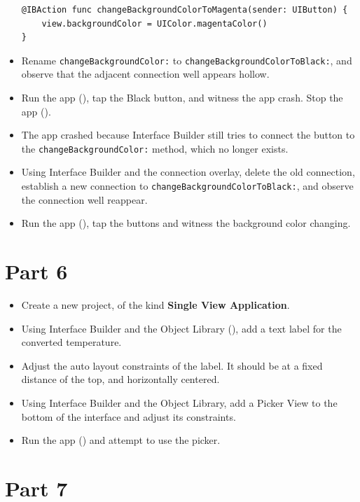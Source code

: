 \documentclass[a4paper,11pt]{scrartcl}
\begin{document}
\begin{itemize}
\begin{lstlisting}
@IBAction func changeBackgroundColorToMagenta(sender: UIButton) {
	view.backgroundColor = UIColor.magentaColor()
}
\end{lstlisting}
\item Rename \texttt{changeBackgroundColor:} to \texttt{changeBackgroundColorToBlack:}, and observe that the adjacent connection well appears hollow.
\item Run the app (), tap the Black button, and witness the app crash. Stop the app ().
\item The app crashed because Interface Builder still tries to connect the button to the \texttt{changeBackgroundColor:} method, which no longer exists.
\item Using Interface Builder and the connection overlay, delete the old connection, establish a new connection to \texttt{changeBackgroundColorToBlack:}, and observe the connection well reappear.
\item Run the app (), tap the buttons and witness the background color changing.
\end{itemize}


\section*{Part 6}

\begin{itemize}
\item Create a new project, of the kind \textbf{Single View Application}.
\item Using Interface Builder and the Object Library (), add a text label for the converted temperature.
\item Adjust the auto layout constraints of the label. It should be at a fixed distance of the top, and horizontally centered.
\item Using Interface Builder and the Object Library, add a Picker View to the bottom of the interface and adjust its constraints.
\item Run the app () and attempt to use the picker.
\end{itemize}

\section*{Part 7}
\end{document}
